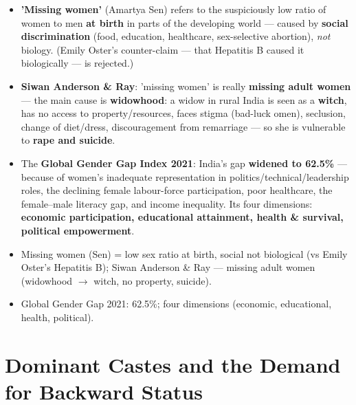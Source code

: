 \begin{KeyConcept}
\begin{itemize}
\item \textbf{'Missing women'} (Amartya Sen) refers to the suspiciously low ratio of women to men \textbf{at birth} in parts of the developing world --- caused by \textbf{social discrimination} (food, education, healthcare, sex-selective abortion), \emph{not} biology. (Emily Oster's counter-claim --- that Hepatitis B caused it biologically --- is rejected.)
\item \textbf{Siwan Anderson \& Ray}: 'missing women' is really \textbf{missing adult women} --- the main cause is \textbf{widowhood}: a widow in rural India is seen as a \textbf{witch}, has no access to property/resources, faces stigma (bad-luck omen), seclusion, change of diet/dress, discouragement from remarriage --- so she is vulnerable to \textbf{rape and suicide}.
\item The \textbf{Global Gender Gap Index 2021}: India's gap \textbf{widened to 62.5\%} --- because of women's inadequate representation in politics/technical/leadership roles, the declining female labour-force participation, poor healthcare, the female--male literacy gap, and income inequality. Its four dimensions: \textbf{economic participation, educational attainment, health \& survival, political empowerment}.
\end{itemize}
\end{KeyConcept}

\begin{QuickRevision}
\begin{itemize}
\item Missing women (Sen) = low sex ratio at birth, social not biological (vs Emily Oster's Hepatitis B); Siwan Anderson \& Ray --- missing adult women (widowhood $\rightarrow$ witch, no property, suicide).
\item Global Gender Gap 2021: 62.5\%; four dimensions (economic, educational, health, political).
\end{itemize}
\end{QuickRevision}

\section{Dominant Castes and the Demand for Backward Status}

